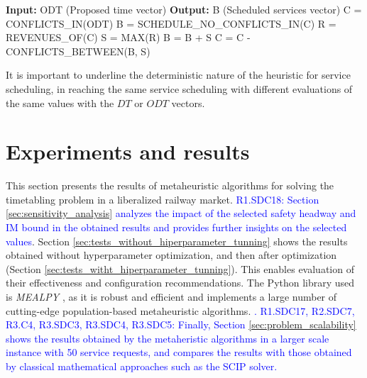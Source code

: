\documentclass[Afour,sagev,times]{sagej}
\newcommand{\primero}[1]{\textcolor{blue}{#1}}
\begin{document}
\begin{algorithm}
\caption{Heuristic for obtaining the services to be scheduled}
\label{alg:heuristico_planificacion}
\begin{algorithmic}[1]
\STATE \textbf{Input:} ODT (Proposed time vector)
\STATE \textbf{Output:} B (Scheduled services vector)
\STATE C = CONFLICTS\_IN(ODT) %
\STATE B = SCHEDULE\_NO\_CONFLICTS\_IN(C) %
\STATE R = REVENUES\_OF(C) %
\STATE S = MAX(R) %
\STATE B = B + S %
\STATE C = C - CONFLICTS\_BETWEEN(B, S) %
\ENDWHILE
\end{algorithmic}
\end{algorithm}

It is important to underline the deterministic nature of the heuristic for service scheduling, in reaching the same service scheduling with different evaluations of the same values with the $ DT $ or $ ODT $ vectors.

\section{Experiments and results}
\label{sec:results}

This section presents the results of metaheuristic algorithms for solving the timetabling problem in a liberalized railway market. \primero{R1.SDC18: Section \ref{sec:sensitivity_analysis} analyzes the impact of the selected safety headway and \gls{IM} bound in the obtained results and provides further insights on the selected values}. Section \ref{sec:tests_without_hiperparameter_tunning} shows the results obtained without hyperparameter optimization, and then after optimization (Section \ref{sec:tests_witht_hiperparameter_tunning}). This enables evaluation of their effectiveness and configuration recommendations. The Python library used is \textit{MEALPY} \cite{Vanthieu2023}, as it is  robust and efficient and implements a large number of cutting-edge population-based metaheuristic algorithms. \primero{. R1.SDC17, R2.SDC7, R3.C4, R3.SDC3, R3.SDC4, R3.SDC5: Finally, Section \ref{sec:problem_scalability} shows the results obtained by the metaheristic algorithms in a larger scale instance with 50 service requests, and compares the results with those obtained by classical mathematical approaches such as the \gls{SCIP} solver.}
\end{document}
